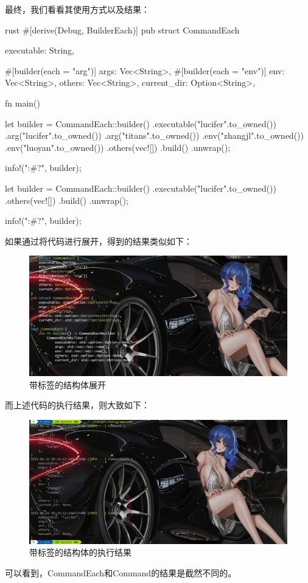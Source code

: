 最终，我们看看其使用方式以及结果：
\begin{code-block}{rust}
#[derive(Debug, BuilderEach)]
pub struct CommandEach {
    executable: String,

    #[builder(each = "arg")]
    args: Vec<String>,
    #[builder(each = "env")]
    env: Vec<String>,
    others: Vec<String>,
    current_dir: Option<String>,
}

fn main() {

    let builder = CommandEach::builder()
        .executable("lucifer".to_owned())
        .arg("lucifer".to_owned())
        .arg("titans".to_owned())
        .env("zhangjl".to_owned())
        .env("luoyan".to_owned())
        .others(vec![])
        .build()
        .unwrap();

    info!("{:#?}", builder);

    let builder = CommandEach::builder()
        .executable("lucifer".to_owned())
        .others(vec![])
        .build()
        .unwrap();

    info!("{:#?}", builder);
}
\end{code-block}

如果通过将代码进行展开，得到的结果类似如下：
\begin{figure}[H]
  \centering
  \includegraphics[width=\linewidth]{rust_label_expand.png}
  \caption{带标签的结构体展开}
  \label{fig:rust_label_expand}
\end{figure}
而上述代码的执行结果，则大致如下：
\begin{figure}[H]
  \centering
  \includegraphics[width=\linewidth]{rust_label_result.png}
  \caption{带标签的结构体的执行结果}
  \label{fig:rust_label_result}
\end{figure}
可以看到，CommandEach和Command的结果是截然不同的。


